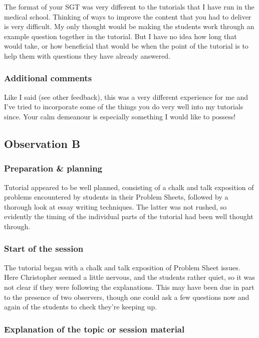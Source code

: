 The format of your SGT was very different to the tutorials that I have run in the medical school. Thinking of ways to improve the content that you had to deliver is very difficult. My only thought would be making the students work through an example question together in the tutorial. But I have no idea how long that would take, or how beneficial that would be when the point of the tutorial is to help them with questions they have already answered.

\subsubsection{Additional comments}

Like I said (see other feedback), this was a very different experience for me and I've tried to incorporate some of the things you do very well into my tutorials since. Your calm demeanour is especially something I would like to possess!


\subsection{Observation B}\label{sec:me-B}

\subsubsection{Preparation \& planning}\label{sec:B-plan}

Tutorial appeared to be well planned, consisting of a chalk and talk exposition of problems encountered by students in their Problem Sheets, followed by a thorough look at essay writing techniques. The latter was not rushed, so evidently the timing of the individual parts of the tutorial had been well thought through.

\subsubsection{Start of the session}\label{sec:B-start}

The tutorial began with a chalk and talk exposition of Problem Sheet issues. Here Christopher seemed a little nervous, and the students rather quiet, so it was not clear if they were following the explanations. This may have been due in part to the presence of two observers, though one could ask a few questions now and again of the students to check they're keeping up.

\subsubsection{Explanation of the topic or session material}\label{sec:B-topic}

